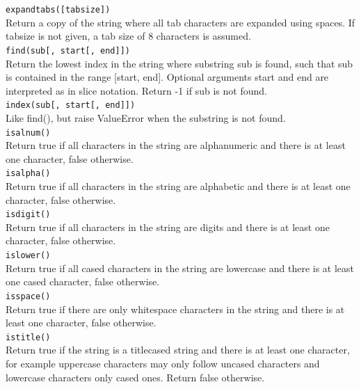 \noindent
{\tt expandtabs([tabsize])}\\
Return a copy of the string where all tab characters are expanded using spaces. 
If tabsize is not given, a tab size of 8 characters is assumed.\\

\noindent
{\tt find(sub[, start[, end]])}\\
Return the lowest index in the string where substring sub is found, such that 
sub is contained in the range [start, end]. Optional arguments start and end 
are interpreted as in slice notation. Return -1 if sub is not found.\\

\noindent
{\tt index(sub[, start[, end]])}\\
Like find(), but raise ValueError when the substring is not found.\\

\noindent
{\tt isalnum()}\\
Return true if all characters in the string are alphanumeric and 
there is at least one character, false otherwise.\\

\noindent
{\tt isalpha()}\\
Return true if all characters in the string are alphabetic and 
there is at least one character, false otherwise.\\

\noindent
{\tt isdigit()}\\
Return true if all characters in the string are digits and there is at least one character, false otherwise.\\

\noindent
{\tt islower()}\\
Return true if all cased characters in the string are lowercase and there is at least one cased character, false otherwise.\\

\noindent
{\tt isspace()}\\
Return true if there are only whitespace characters in the string and there is at least one character, false otherwise.\\

\noindent
{\tt istitle()}\\
Return true if the string is a titlecased string and there is at least one character, for example uppercase characters may only follow uncased characters and lowercase characters only cased ones. Return false otherwise.\\

